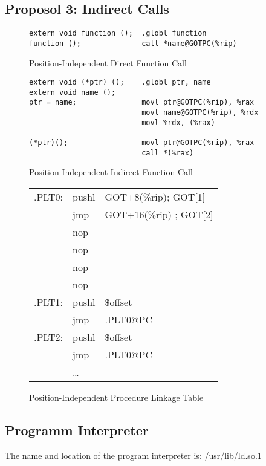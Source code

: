 
\subsection{Proposol 3: Indirect Calls}



\begin{figure}[H]
\caption{Position-Independent Direct Function Call}
\begin{verbatim}
extern void function ();  .globl function
function ();              call *name@GOTPC(%rip)
\end{verbatim}
\end{figure}

\begin{figure}[H]
\caption{Position-Independent Indirect Function Call}
\begin{verbatim}
extern void (*ptr) ();    .globl ptr, name
extern void name ();
ptr = name;               movl ptr@GOTPC(%rip), %rax
                          movl name@GOTPC(%rip), %rdx
                          movl %rdx, (%rax)

(*ptr)();                 movl ptr@GOTPC(%rip), %rax
                          call *(%rax)
\end{verbatim}
\end{figure}

\begin{figure}[H]
\caption{Position-Independent Procedure Linkage Table}
\begin{tabular}{lll}
.PLT0: & pushl & GOT+8(\%rip); GOT[1]\\
& jmp &GOT+16(\%rip) ; GOT[2] \\
& nop & \\
& nop & \\
& nop & \\
& nop & \\
.PLT1: & pushl & \$offset \\
&jmp &.PLT0@PC \\
.PLT2: &pushl & \$offset \\
& jmp & .PLT0@PC \\
&\dots\\
\end{tabular}
\end{figure}



\subsection{Programm Interpreter}

The name and location of the program interpreter is:
/usr/lib/ld.so.1

